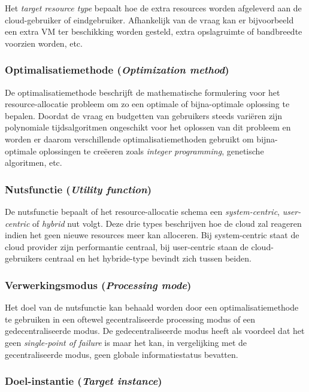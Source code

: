 Het \textit{target resource type} bepaalt hoe de extra resources worden afgeleverd aan de cloud-gebruiker of eindgebruiker. Afhankelijk van de vraag kan er bijvoorbeeld een extra VM ter beschikking worden gesteld, extra opslagruimte of bandbreedte voorzien worden, etc.

\subsubsection{Optimalisatiemethode (\textit{Optimization method})}

De optimalisatiemethode beschrijft de mathematische formulering voor het resource-allocatie probleem om zo een optimale of bijna-optimale oplossing te bepalen. Doordat de vraag en budgetten van gebruikers steeds variëren zijn polynomiale tijdsalgoritmen ongeschikt voor het oplossen van dit probleem en worden er daarom verschillende optimalisatiemethoden gebruikt om bijna-optimale oplossingen te creëeren zoals \textit{integer programming}, genetische algoritmen, etc.

\subsubsection{Nutsfunctie (\textit{Utility function})}

De nutsfunctie bepaalt of het resource-allocatie schema een \textit{system-centric}, \textit{user-centric} of \textit{hybrid} nut volgt. Deze drie types beschrijven hoe de cloud zal reageren indien het geen nieuwe resources meer kan alloceren. Bij system-centric staat de cloud provider zijn performantie centraal, bij user-centric staan de cloud-gebruikers centraal en het hybride-type bevindt zich tussen beiden.

\subsubsection{Verwerkingsmodus (\textit{Processing mode})}

Het doel van de nutsfunctie kan behaald worden door een optimalisatiemethode te gebruiken in een oftewel gecentraliseerde processing modus of een gedecentraliseerde modus. De gedecentraliseerde modus heeft als voordeel dat het geen \textit{single-point of failure} is maar het kan, in vergelijking met de gecentraliseerde modus, geen globale informatiestatus bevatten.

\subsubsection{Doel-instantie (\textit{Target instance})}

